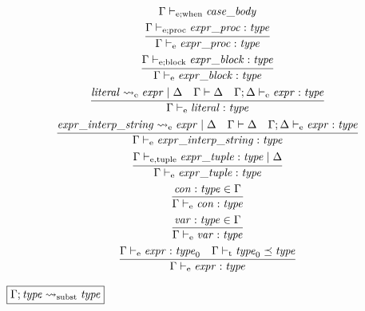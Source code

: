 \begin{gather*}
{        \Gamma \vdash_{\mathrm{e}; \mathrm{when}} \mathit{case\_body}
    }
    \\
    \infer{\Gamma \vdash_\mathrm{e} \mathit{expr\_proc}: \mathit{type}}{
        \Gamma \vdash_{\mathrm{e}; \mathrm{proc}} \mathit{expr\_proc}: \mathit{type}
    }
    \\
    \infer{\Gamma \vdash_\mathrm{e} \mathit{expr\_block}: \mathit{type}}{
        \Gamma \vdash_{\mathrm{e}; \mathrm{block}} \mathit{expr\_block}: \mathit{type}
    }
    \\
    \infer{\Gamma \vdash_\mathrm{e} \mathit{literal}: \mathit{type}}{
        \mathit{literal} \rightsquigarrow_\mathrm{e} \mathit{expr} \mid \Delta
        &
        \Gamma \vdash \Delta
        &
        \Gamma; \Delta \vdash_\mathrm{e} \mathit{expr}: \mathit{type}
    }
    \\
    \infer{\Gamma \vdash_\mathrm{e} \mathit{expr\_interp\_string}: \mathit{type}}{
        \mathit{expr\_interp\_string} \rightsquigarrow_\mathrm{e} \mathit{expr} \mid \Delta
        &
        \Gamma \vdash \Delta
        &
        \Gamma; \Delta \vdash_\mathrm{e} \mathit{expr}: \mathit{type}
    }
    \\
    \infer{\Gamma \vdash_\mathrm{e} \mathit{expr\_tuple}: \mathit{type}}{
        \Gamma \vdash_{\mathrm{e}, \mathrm{tuple}} \mathit{expr\_tuple}: \mathit{type} \mid \Delta
    }
    \\
    \infer{\Gamma \vdash_\mathrm{e} \mathit{con}: \mathit{type}}{
        \mathit{con}: \mathit{type} \in \Gamma
    }
    \\
    \infer{\Gamma \vdash_\mathrm{e} \mathit{var}: \mathit{type}}{
        \mathit{var}: \mathit{type} \in \Gamma
    }
    \\
    \infer{\Gamma \vdash_\mathrm{e} \mathit{expr}: \mathit{type}}{
        \Gamma \vdash_\mathrm{e} \mathit{expr}: \mathit{type}_0
        &
        \Gamma \vdash_\mathrm{t} \mathit{type}_0 \preceq \mathit{type}
    }
\end{gather*}

$\fbox{$\Gamma; \mathit{type} \rightsquigarrow_\mathrm{subst} \mathit{type}$}$

